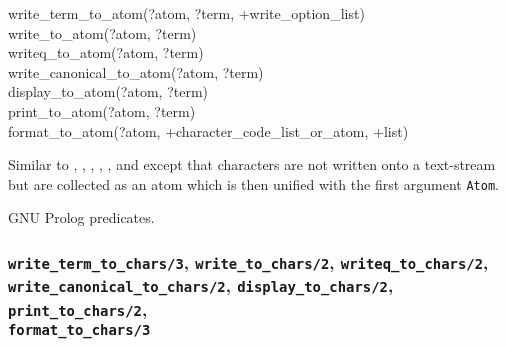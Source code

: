 \begin{TemplatesOneCol}
write\_term\_to\_atom(?atom, ?term, +write\_option\_list)\\
write\_to\_atom(?atom, ?term)\\
writeq\_to\_atom(?atom, ?term)\\
write\_canonical\_to\_atom(?atom, ?term)\\
display\_to\_atom(?atom, ?term)\\
print\_to\_atom(?atom, ?term)\\
format\_to\_atom(?atom, +character\_code\_list\_or\_atom, +list)

\end{TemplatesOneCol}

\Description

\texttt{}%
\texttt{}%
\texttt{}%
\texttt{}%
\texttt{}%
\texttt{}%
\texttt{}%
Similar to , , ,
, , 
 and   except that
characters are not written onto a text-stream but are collected as an atom
which is then unified with the first argument \texttt{Atom}.

\begin{PlErrors}



\end{PlErrors}

\Portability

GNU Prolog predicates.

\subsubsection{\texttt{write\_term\_to\_chars/3},
               \texttt{write\_to\_chars/2},
               \texttt{writeq\_to\_chars/2}, \\
               \texttt{write\_canonical\_to\_chars/2}, 
               \texttt{display\_to\_chars/2},
               \texttt{print\_to\_chars/2}, \\
               \texttt{format\_to\_chars/3}} 

